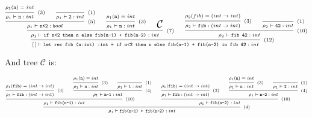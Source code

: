 \documentclass[addpoints]{exam}
\newcommand{\TJDG}[3]{#1 \vdash #2 : #3}
\begin{document}
\begin{questions}
\begin{solutionbox}{20cm}
    \vspace{1cm}
  \begin{sideways}
    \begin{minipage}{\textwidth}
      \[
      \scriptsize
      \begin{prooftree}
                \hypo{\rho_1(\texttt{n}) = int}
              \infer1[(3)]{\TJDG{\rho_1}{\texttt{n}}{int}}
              \infer0[(1)]{\TJDG{\rho_1}{\texttt{2}}{int}}
            \infer2[(5)]{\TJDG{\rho_1}{\texttt{n<2}}{bool}}
              \hypo{\rho_1(\texttt{n}) = int}
            \infer1[(3)]{\TJDG{\rho_1}{\texttt{n}}{int}}
            \hypo{\textrm{\Large $\mathcal{C}$}}
          \infer3[(7)]{\TJDG{\rho_1}{\texttt{if n<2 then n else fib(n-1) + fib(n-2)}}{int}}
              \hypo{\rho_2(fib) = (int \to int)}
            \infer1[(3)]{\TJDG{\rho_2}{\texttt{fib}}{(int \to int)}}
            \infer0[(1)]{\TJDG{\rho_2}{\texttt{42}}{int}}
          \infer2[(10)]{\TJDG{\rho_2}{\texttt{fib 42}}{int}}
        \infer2[(12)]{\TJDG{[\,]}{\texttt{let rec fib (n:int) :int = if n<2 then n else fib(n-1) + fib(n-2) in fib 42}}{int}}
      \end{prooftree}
      \]

      \vspace{2cm}
      And tree {\Large $\mathcal{C}$} is:
      
      \[
      \scriptsize
      \begin{prooftree}
                    \hypo{\rho_1(\texttt{fib}) = (int\to int)}
                \infer1[(3)]{\TJDG{\rho_1}{\texttt{fib}}{(int\to int)}}
                    \hypo{\rho_1(\texttt{n}) = int}
                  \infer1[(3)]{\TJDG{\rho_1}{\texttt{n}}{int}}
                  \infer0[(1)]{\TJDG{\rho_1}{\texttt{1}}{int}}
                \infer2[(4)]{\TJDG{\rho_1}{\texttt{n-1}}{int}}
              \infer2[(10)]{\TJDG{\rho_1}{\texttt{fib(n-1)}}{int}}
                  \hypo{\rho_1(\texttt{fib}) = (int\to int)}
                \infer1[(3)]{\TJDG{\rho_1}{\texttt{fib}}{(int\to int)}}
                    \hypo{\rho_1(\texttt{n}) = int}
                  \infer1[(3)]{\TJDG{\rho_1}{\texttt{n}}{int}}
                  \infer0[(1)]{\TJDG{\rho_1}{\texttt{2}}{int}}
                \infer2[(4)]{\TJDG{\rho_1}{\texttt{n-2}}{int}}
              \infer2[(10)]{\TJDG{\rho_1}{\texttt{fib(n-2)}}{int}}
            \infer2[(4)]{\TJDG{\rho_1}{\texttt{fib(n-1) + fib(n-2)}}{int}}
      \end{prooftree}
      \]
    \end{minipage}
  \end{sideways}
  \end{solutionbox}


\end{questions}
\end{document}
